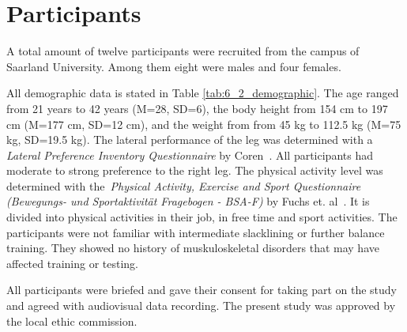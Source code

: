 \section{Participants}\label{6_participants}
A total amount of twelve participants were recruited from the campus of Saarland University.
Among them eight were males and four females.

All demographic data is stated in Table \ref{tab:6_2_demographic}.
The age ranged from 21 years to 42 years (M=28, SD=6), the body height from 154 cm to 197 cm (M=177 cm, SD=12 cm), and the weight from from 45 kg to 112.5 kg (M=75 kg, SD=19.5 kg).
The lateral performance of the leg was determined with a \textit{Lateral Preference Inventory Questionnaire} by Coren~\cite{Coren1993-lp}.
All participants had moderate to strong preference to the right leg.
The physical activity level was determined with the~\textit{Physical Activity, Exercise and Sport Questionnaire (Bewegungs- und Sportaktivität Fragebogen - BSA-F)} by Fuchs et. al~\cite{Fuchs2015-bsa}.
It is divided into physical activities in their job, in free time and sport activities.
The participants were not familiar with intermediate slacklining or further balance training. They showed no history of muskuloskeletal disorders that may have affected training or testing.

All participants were briefed and gave their consent for taking part on the study and agreed with audiovisual data recording.
The present study was approved by the local ethic commission.

